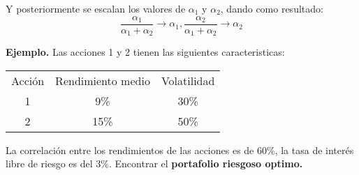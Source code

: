 \documentclass[12pts]{extarticle}
\begin{document}
Y posteriormente se escalan los valores de $\alpha_1$ y $\alpha_2 $, dando como resultado:
$$ \frac{\alpha_1}{\alpha_1 +\alpha_2} \rightarrow \alpha_1, \frac{\alpha_2}{\alpha_1 + \alpha_2} \rightarrow \alpha_2 $$ 

\textbf{Ejemplo.} Las acciones 1 y 2 tienen las siguientes caracteristicas:
 \begin{center}
\begin{tabular}{ c c c }
 Acción  & Rendimiento medio & Volatilidad \\ 
 1 & 9\% & 30\% \\  
 2 & 15\%  & 50\%    
\end{tabular}
\end{center}
La correlación entre los rendimientos de las acciones es de $60\%$, la tasa de interés libre de riesgo es del $3\%$. Encontrar el \textbf{portafolio riesgoso optimo.} 
\end{document}
